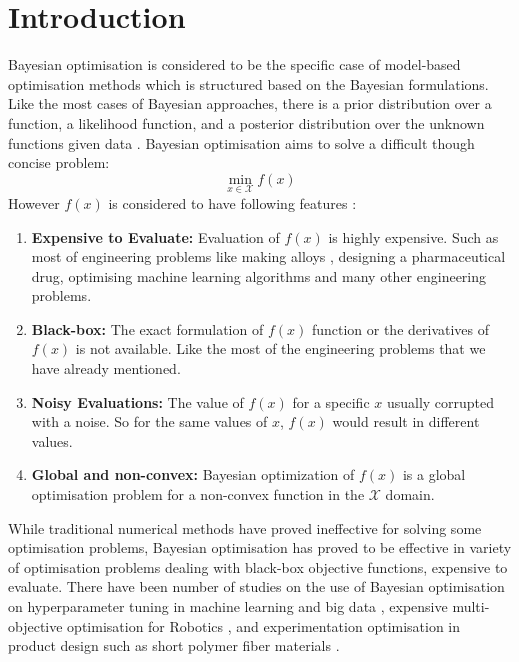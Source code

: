 \chapter{Introduction}
Bayesian optimisation is considered to be the specific case of model-based optimisation methods which is structured based on the Bayesian formulations. Like the most cases of Bayesian approaches, there is a prior distribution over a function, a likelihood function, and a posterior distribution over the unknown functions given data \cite{gelbart2015constrained}. Bayesian optimisation aims to solve a difficult though concise problem:
\begin{equation}
	\operatorname*{min}_{x \in \mathcal{X}} f(x)	
\label{eq:ch1_1}
\end{equation}
However $f(x)$ is considered to have following features \cite{gelbart2015constrained}:
\begin{enumerate}
\item \textbf{Expensive to Evaluate: } Evaluation of $f(x)$ is highly expensive. Such as most of engineering problems like making alloys \cite{vellanki2017process}, designing a pharmaceutical drug, optimising machine learning algorithms \cite{snoek2012practical} and many other engineering problems.
\item \textbf{Black-box: } The exact formulation of $f(x)$ function or the derivatives of $f(x)$ is not available. Like the most of the engineering problems that we have already mentioned.
\item \textbf{Noisy Evaluations: } The value of $f(x)$ for a specific $x$ usually corrupted with a noise. So for the same values of $x$, $f(x)$ would result in different values.
\item \textbf{Global and non-convex: } Bayesian optimization of $f(x)$ is a global optimisation problem for a non-convex function in the $\mathcal{X}$ domain.
\end{enumerate}
While traditional numerical methods have proved ineffective for solving some optimisation problems, Bayesian optimisation has proved to be effective in variety of optimisation problems dealing with black-box objective functions, expensive to evaluate. There have been number of studies on the use of Bayesian optimisation on hyperparameter tuning in machine learning and big data \cite{joy2016hyperparameter}, expensive multi-objective optimisation for Robotics \cite{tesch2013expensive}, and experimentation optimisation in product design such as short polymer fiber materials \cite{li2017rapid}.
\par
